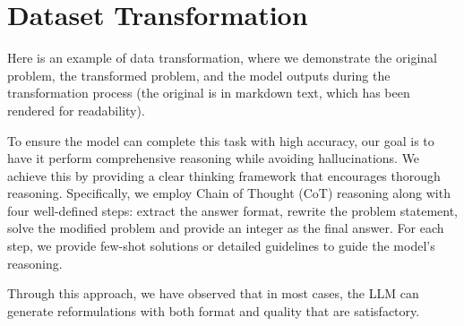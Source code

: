 \section{Dataset Transformation}

Here is an example of data transformation, where we demonstrate the original problem, the transformed problem, and the model outputs during the transformation process (the original is in markdown text, which has been rendered for readability). 

To ensure the model can complete this task with high accuracy, our goal is to have it perform comprehensive reasoning while avoiding hallucinations. We achieve this by providing a clear thinking framework that encourages thorough reasoning. Specifically, we employ Chain of Thought (CoT) reasoning along with four well-defined steps: extract the answer format, rewrite the problem statement, solve the modified problem and provide an integer as the final answer. For each step, we provide few-shot solutions or detailed guidelines to guide the model's reasoning.

Through this approach, we have observed that in most cases, the LLM can generate reformulations with both format and quality that are satisfactory.

